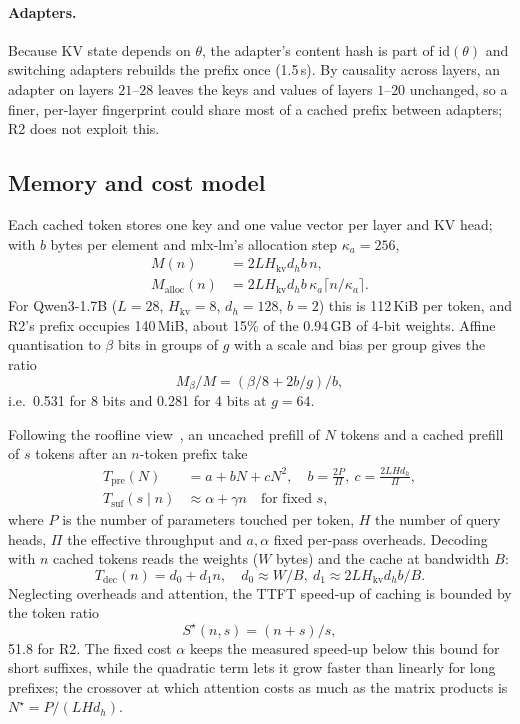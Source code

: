 \documentclass[10pt,twocolumn,letterpaper]{article}
\theoremstyle{definition}
\newcommand{\Hkv}{H_{\mathrm{kv}}}
\begin{document}
\paragraph{Adapters.}
Because KV state depends on $\theta$, the adapter's content hash is part of $\mathrm{id}(\theta)$
and switching adapters rebuilds the prefix once (1.5\,s). By causality across layers, an adapter on
layers $21$--$28$ leaves the keys and values of layers $1$--$20$ unchanged, so a finer, per-layer
fingerprint could share most of a cached prefix between adapters; R2 does not exploit this.

\subsection{Memory and cost model}\label{sec:memory}\label{sec:cost}\label{sec:speedup}

Each cached token stores one key and one value vector per layer and KV head; with $b$ bytes per
element and mlx-lm's allocation step $\kappa_a=256$,
\begin{align}
M(n)&=2L\Hkv d_h b\,n,\label{eq:mem}\\
M_{\text{alloc}}(n)&=2L\Hkv d_h b\,\kappa_a\lceil n/\kappa_a\rceil.\label{eq:alloc}
\end{align}
For Qwen3-1.7B ($L=28$, $\Hkv=8$, $d_h=128$, $b=2$) this is 112\,KiB per token, and R2's prefix
occupies 140\,MiB, about 15\% of the 0.94\,GB of 4-bit weights. Affine quantisation to $\beta$ bits
in groups of $g$ with a scale and bias per group gives the ratio
\begin{equation}
M_\beta/M=(\beta/8+2b/g)/b, \label{eq:memq}
\end{equation}
i.e.\ 0.531 for 8 bits and 0.281 for 4 bits at $g=64$.

Following the roofline view~\cite{williams2009roofline,pope2023efficiently}, an uncached prefill of
$N$ tokens and a cached prefill of $s$ tokens after an $n$-token prefix take
\begin{align}
T_{\text{pre}}(N)&=a+bN+cN^2,\quad b=\tfrac{2P}{\Pi},\ c=\tfrac{2LHd_h}{\Pi},\label{eq:tpre}\\
T_{\text{suf}}(s\mid n)&\approx\alpha+\gamma n\quad\text{for fixed }s,\label{eq:tsuf}
\end{align}
where $P$ is the number of parameters touched per token, $H$ the number of query heads, $\Pi$ the
effective throughput and $a,\alpha$ fixed per-pass overheads. Decoding with $n$ cached tokens reads
the weights ($W$ bytes) and the cache at bandwidth $B$:
\begin{equation}
T_{\text{dec}}(n)=d_0+d_1n,\quad d_0\approx W/B,\ d_1\approx 2L\Hkv d_h b/B.\label{eq:tdec}
\end{equation}
Neglecting overheads and attention, the TTFT speed-up of caching is bounded by the token ratio
\begin{equation}
S^\star(n,s)=(n+s)/s,\label{eq:bound}
\end{equation}
51.8 for R2. The fixed cost $\alpha$ keeps the measured speed-up below this bound for short
suffixes, while the quadratic term lets it grow faster than linearly for long prefixes; the crossover
at which attention costs as much as the matrix products is $N^\star=P/(LHd_h)$.
\end{document}
